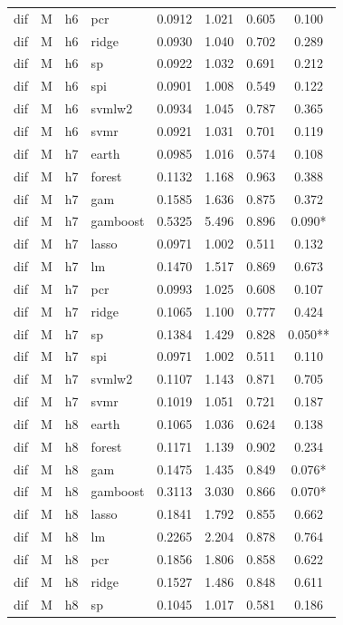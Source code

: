 \begin{ThreePartTable}
\begin{longtable}[t]{llclcccc}
dif & M & h6 & pcr & 0.0912 & 1.021 & 0.605 & 0.100\\
dif & M & h6 & ridge & 0.0930 & 1.040 & 0.702 & 0.289\\
dif & M & h6 & sp & 0.0922 & 1.032 & 0.691 & 0.212\\
dif & M & h6 & spi & 0.0901 & 1.008 & 0.549 & 0.122\\
dif & M & h6 & svmlw2 & 0.0934 & 1.045 & 0.787 & 0.365\\
dif & M & h6 & svmr & 0.0921 & 1.031 & 0.701 & 0.119\\
\addlinespace
dif & M & h7 & earth & 0.0985 & 1.016 & 0.574 & 0.108\\
dif & M & h7 & forest & 0.1132 & 1.168 & 0.963 & 0.388\\
dif & M & h7 & gam & 0.1585 & 1.636 & 0.875 & 0.372\\
dif & M & h7 & gamboost & 0.5325 & 5.496 & 0.896 & 0.090*\\
dif & M & h7 & lasso & 0.0971 & 1.002 & 0.511 & 0.132\\
dif & M & h7 & lm & 0.1470 & 1.517 & 0.869 & 0.673\\
dif & M & h7 & pcr & 0.0993 & 1.025 & 0.608 & 0.107\\
dif & M & h7 & ridge & 0.1065 & 1.100 & 0.777 & 0.424\\
dif & M & h7 & sp & 0.1384 & 1.429 & 0.828 & 0.050**\\
dif & M & h7 & spi & 0.0971 & 1.002 & 0.511 & 0.110\\
dif & M & h7 & svmlw2 & 0.1107 & 1.143 & 0.871 & 0.705\\
dif & M & h7 & svmr & 0.1019 & 1.051 & 0.721 & 0.187\\
\addlinespace
dif & M & h8 & earth & 0.1065 & 1.036 & 0.624 & 0.138\\
dif & M & h8 & forest & 0.1171 & 1.139 & 0.902 & 0.234\\
dif & M & h8 & gam & 0.1475 & 1.435 & 0.849 & 0.076*\\
dif & M & h8 & gamboost & 0.3113 & 3.030 & 0.866 & 0.070*\\
dif & M & h8 & lasso & 0.1841 & 1.792 & 0.855 & 0.662\\
dif & M & h8 & lm & 0.2265 & 2.204 & 0.878 & 0.764\\
dif & M & h8 & pcr & 0.1856 & 1.806 & 0.858 & 0.622\\
dif & M & h8 & ridge & 0.1527 & 1.486 & 0.848 & 0.611\\
dif & M & h8 & sp & 0.1045 & 1.017 & 0.581 & 0.186\\

\end{longtable}
\end{ThreePartTable}
